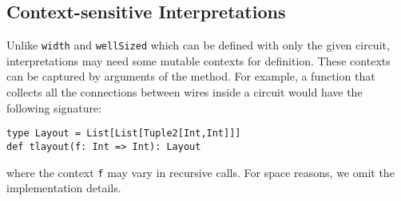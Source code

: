 \subsection{Context-sensitive Interpretations}
Unlike \lstinline{width} and \lstinline{wellSized} which can be defined with
only the given circuit, interpretations may need some mutable contexts for definition.
These contexts can be captured by arguments of the method. For example, a
function that collects all the connections between wires inside a circuit would have
the following signature:
\begin{lstlisting}
type Layout = List[List[Tuple2[Int,Int]]]
def tlayout(f: Int => Int): Layout
\end{lstlisting}
where the context \lstinline{f} may vary in recursive calls.
For space reasons, we omit the implementation details.